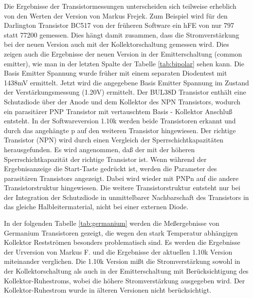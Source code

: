 Die Ergebnisse der Transistormessungen unterscheiden sich teilweise erheblich von den Werten der Version 
von Markus Frejek. Zum Beispiel wird für den Darlington Transistor BC517 von
der früheren Software ein hFE von nur 797 statt 77200 gemessen. 
Dies hängt damit zusammen, dass die Stromverstärkung bei der neuen Version auch mit der
Kollektorschaltung gemessen wird.
Dies zeigen auch die Ergebnisse der neuen Version in der Emitterschaltung (common emitter),
wie man in der letzten Spalte der Tabelle \ref{tab:bipolar} sehen kann.
Die Basis Emitter Spannung wurde früher mit einem separaten Diodentest mit 1438mV ermittelt.
Jetzt wird die angegebene Basis Emitter Spannung im Zustand der Verstärkungsmessung (1.20V) ermittelt.
Der BUL38D Transistor enthält eine Schutzdiode über der Anode und dem Kollektor des NPN Transistors,
wodurch ein parasitärer PNP Transistor mit vertauschtem Basis - Kollektor Anschluß entsteht.
In der Softwareversion 1.10k werden beide Transistoren erkannt und durch das angehängte p auf
den weiteren Transistor hingewiesen.
Der richtige Transistor (NPN) wird durch einen Vergleich der Sperrschichtkapazitäten herausgefunden.
Es wird angenommen, daß der mit der höheren Sperrschichtkapazität der richtige Transistor ist.
Wenn während der Ergebnisanzeige die Start-Taste gedrückt ist, werden die Parameter des parasitären Transistors
angezeigt. Dabei wird wieder mit PNPn auf die andere Transistorstruktur hingewiesen.
Die weitere Transistorstruktur entsteht nur bei der Integration der Schutzdiode in unmittelbarer
Nachbarschaft des Transistors in das gleiche Halbleitermaterial, nicht bei einer externen Diode.

In der folgenden Tabelle \ref{tab:germanium} werden die Meßergebnisse von Germanium Transistoren gezeigt, die wegen den
stark Temperatur abhängigen Kollektor Restströmen besonders problematisch sind.
Es werden die Ergebnisse der Urversion von Markus F. und die Ergebnisse der aktuellen 1.10k Version
miteinander verglichen. Die 1.10k Version mißt die Stromverstärkung sowohl in der
Kollektorschaltung als auch in der Emitterschaltung mit Berücksichtigung des Kollektor-Ruhestroms,
 wobei die höhere Stromverstärkung ausgegeben wird.
Der Kollektor-Ruhestrom wurde in älteren Versionen nicht berücksichtigt.

